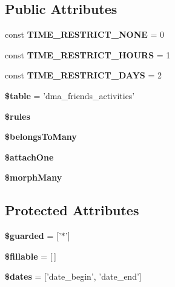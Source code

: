 \subsection*{Public Attributes}
\begin{DoxyCompactItemize}
\item 
\hypertarget{classDMA_1_1Friends_1_1Models_1_1Activity_ab9dd8b18c4810beabdcf8e45039913c8}{const {\bfseries T\-I\-M\-E\-\_\-\-R\-E\-S\-T\-R\-I\-C\-T\-\_\-\-N\-O\-N\-E} = 0}\label{classDMA_1_1Friends_1_1Models_1_1Activity_ab9dd8b18c4810beabdcf8e45039913c8}

\item 
\hypertarget{classDMA_1_1Friends_1_1Models_1_1Activity_ac78040e8784e02c2d1bcce5221ac6cb8}{const {\bfseries T\-I\-M\-E\-\_\-\-R\-E\-S\-T\-R\-I\-C\-T\-\_\-\-H\-O\-U\-R\-S} = 1}\label{classDMA_1_1Friends_1_1Models_1_1Activity_ac78040e8784e02c2d1bcce5221ac6cb8}

\item 
\hypertarget{classDMA_1_1Friends_1_1Models_1_1Activity_a71b85478f20cda144aeffe010364a0f7}{const {\bfseries T\-I\-M\-E\-\_\-\-R\-E\-S\-T\-R\-I\-C\-T\-\_\-\-D\-A\-Y\-S} = 2}\label{classDMA_1_1Friends_1_1Models_1_1Activity_a71b85478f20cda144aeffe010364a0f7}

\item 
\hypertarget{classDMA_1_1Friends_1_1Models_1_1Activity_a2ded517047c73d831aef535c8adc6690}{{\bfseries \$table} = 'dma\-\_\-friends\-\_\-activities'}\label{classDMA_1_1Friends_1_1Models_1_1Activity_a2ded517047c73d831aef535c8adc6690}

\item 
{\bfseries \$rules}
\item 
{\bfseries \$belongs\-To\-Many}
\item 
{\bfseries \$attach\-One}
\item 
{\bfseries \$morph\-Many}
\end{DoxyCompactItemize}
\subsection*{Protected Attributes}
\begin{DoxyCompactItemize}
\item 
\hypertarget{classDMA_1_1Friends_1_1Models_1_1Activity_ac82a10f722788b5c1c7a5295e1ac10c2}{{\bfseries \$guarded} = \mbox{[}'$\ast$'\mbox{]}}\label{classDMA_1_1Friends_1_1Models_1_1Activity_ac82a10f722788b5c1c7a5295e1ac10c2}

\item 
\hypertarget{classDMA_1_1Friends_1_1Models_1_1Activity_ab2a7401215dff9dfd8b600247b12454a}{{\bfseries \$fillable} = \mbox{[}$\,$\mbox{]}}\label{classDMA_1_1Friends_1_1Models_1_1Activity_ab2a7401215dff9dfd8b600247b12454a}

\item 
\hypertarget{classDMA_1_1Friends_1_1Models_1_1Activity_afe94503fbf177345e4bf0b1625dee499}{{\bfseries \$dates} = \mbox{[}'date\-\_\-begin', 'date\-\_\-end'\mbox{]}}\label{classDMA_1_1Friends_1_1Models_1_1Activity_afe94503fbf177345e4bf0b1625dee499}

\end{DoxyCompactItemize}


